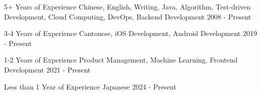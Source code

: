 

\begin{cvhonors}

  \cvhonor
    {5+ Years of Experience} %
    {Chinese, English, Writing, Java, Algorithm, Test-driven Development, Cloud Computing, DevOps, Backend Development} %
    {} %
    {2008 - Present} %

  \cvhonor
    {3-4 Years of Experience} %
    {Cantonese, iOS Development, Android Development} %
    {} %
    {2019 - Present} %

  \cvhonor
    {1-2 Years of Experience} %
    {Product Management, Machine Learning, Frontend Development} %
    {} %
    {2021 - Present} %

  \cvhonor
    {Less than 1 Year of Experience} %
    {Japanese} %
    {} %
    {2024 - Present} %

\end{cvhonors}
